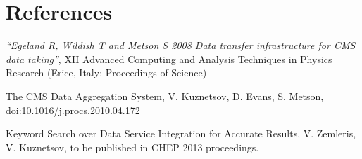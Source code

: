 \section*{References}

\begin{thebibliography}{1}
    {\it ``Egeland R, Wildish T and Metson S 2008 Data transfer infrastructure for CMS data taking''},  XII Advanced Computing and Analysis Techniques in Physics Research (Erice, Italy: Proceedings of Science)

 The CMS Data Aggregation System,
V. Kuznetsov, D. Evans, S. Metson, doi:10.1016/j.procs.2010.04.172

 Keyword Search over Data Service Integration for Accurate
Results, V. Zemleris, V. Kuznetsov, to be published in CHEP 2013 proceedings.

\end{thebibliography}
